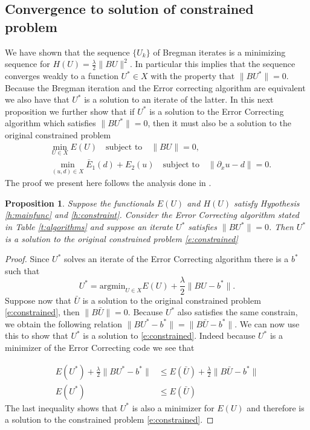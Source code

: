 \documentclass[11pt]{article}
\theoremstyle{plain}
\newtheorem{Proposition}[Lemma]{Proposition}
\begin{document}
\subsection{ Convergence to solution of constrained problem}

We have shown that the sequence $\{ U_k\}$ of Bregman iterates is a minimizing sequence for $H(U) = \frac{\lambda}{2} \|BU\|^2$. In particular this implies that the sequence converges weakly to a function $U^* \in X$ with the property that $\|BU^* \| =0$. Because the Bregman iteration and the Error correcting algorithm are equivalent we also have that $U^*$ is a solution to an iterate of the latter. In this next proposition we further show that if $U^*$ is a solution to the Error Correcting algorithm which satisfies $\| BU^*\| =0$, then it must also be a solution to the original constrained problem
\begin{align}\label{e:constrained} 
&\min_{U \in X} E(U) \quad \mbox{subject to} \quad \|BU \| =0,\\ \nonumber
&\min_{(u,d) \in X} \bar{E}_1(d) + E_2(u)  \quad \mbox{subject to} \quad \|\partial_x u - d \| =0.
\end{align}
The proof we present here follows the analysis done in \cite{goldstein2009}.
\begin{Proposition}
Suppose the functionals $E(U)$ and $H(U)$ satisfy Hypothesis  \ref{h:mainfunc} and \ref{h:constraint}. Consider the Error Correcting algorithm stated in Table \ref{t:algorithms} and suppose an iterate $U^*$ satisfies $\| BU^*\| =0$. Then $U^*$ is a solution to the original constrained problem \eqref{e:constrained}
\end{Proposition}

\begin{proof}
Since $U^*$ solves an iterate of the Error Correcting algorithm there is a $b^*$ such that $$U^* = \mbox{argmin}_{U \in X} E(U) + \frac{\lambda}{2} \| BU -b^*\|.$$
Suppose now that $\bar{U}$ is a solution to the original constrained problem \eqref{e:constrained}, then $\|B\bar{U} \| =0$. Because $U^*$ also satisfies the same constrain, we obtain the following relation $\|BU^* -b^* \| = \| B\bar{U} - b^*\|$. We can now use this to show that $U^*$ is a solution to  \eqref{e:constrained}. Indeed because $U^*$ is a minimizer of the Error Correcting code we see that

 \begin{align*}
E(U^*) + \frac{\lambda}{2} \|BU^* -b^*\| &\leq E(\bar{U}) + \frac{\lambda}{2} \|B\bar{U} -b^*\|\\
E(U^*) &\leq E(\bar{U}) 
\end{align*}
The last inequality shows that $U^*$ is also a minimizer for $E(U)$ and therefore is a solution to the constrained problem \eqref{e:constrained}.


\end{proof}
\end{document}
